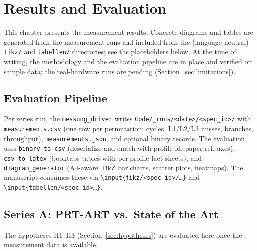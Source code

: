 \chapter{Results and Evaluation}\label{ch:results}

This chapter presents the measurement results. Concrete diagrams and tables are generated from the
measurement runs and included from the (language-neutral) \texttt{tikz/} and \texttt{tabellen/}
directories; see the placeholders below. At the time of writing, the methodology and the evaluation
pipeline are in place and verified on sample data; the real-hardware runs are pending
(Section~\ref{sec:limitations}).

\section{Evaluation Pipeline}\label{sec:eval-pipeline}

Per series run, the \texttt{messung\_driver} writes \texttt{Code/\_runs/<date>/<spec\_id>/} with
\texttt{measurements.csv} (one row per permutation: cycles, L1/L2/L3 misses, branches, throughput),
\texttt{measurements.json}, and optional binary records. The evaluation uses
\texttt{binary\_to\_csv} (deserialize and enrich with profile id, paper ref, axes),
\texttt{csv\_to\_latex} (booktabs tables with per-profile fact sheets), and
\texttt{diagram\_generator} (A4-aware TikZ bar charts, scatter plots, heatmaps). The manuscript
consumes these via \texttt{\textbackslash{}input\{tikz/<spec\_id>/\ldots\}} and
\texttt{\textbackslash{}input\{tabellen/<spec\_id>\ldots\}}.

\section{Series A\@: PRT-ART vs.\ State of the Art}\label{sec:result-a}

%   
%   
The hypotheses H1--H3 (Section~\ref{sec:hypotheses}) are evaluated here once the measurement data is
available.

